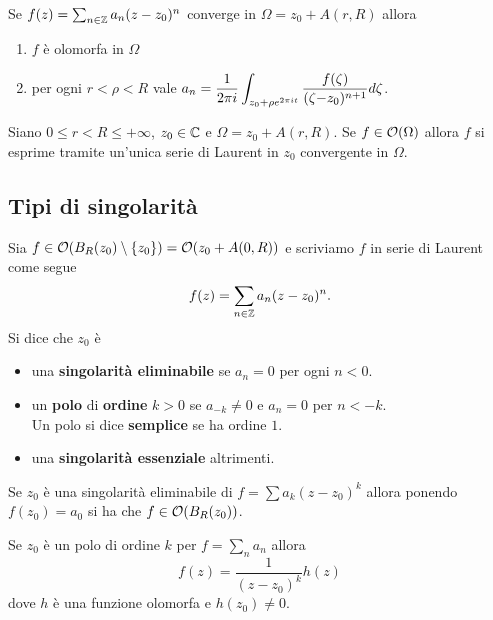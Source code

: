 \begin{multicols*}{2}
\begin{proposition}\label{ProprietaLaurent}
Se $f(z)=\sum_{n\in\mathbb{Z}}a_n(z-z_0)^n$ converge in $\Omega=z_0+A(r,R)$ allora
\begin{enumerate}[noitemsep]
\item $f$ \`e olomorfa in $\Omega$
\item per ogni $r<\rho<R$ vale $\displaystyle a_n=\cauchyint[n+1]{z_0+\rho e^{2\pi it}}$.
\end{enumerate}
\end{proposition}

\begin{theorem}\label{OlomorfaSuAnelloESerieDiLaurent}
Siano $0\leq r<R\leq +\infty$, $z_0\in \mathbb{C}$ e $\Omega=z_0+A(r,R)$. Se $f\in\mathcal{O}(\Omega)$ allora $f$ si esprime tramite un'unica serie di Laurent in $z_0$ convergente in $\Omega$.
\end{theorem}


\subsection{Tipi di singolarit\`a}
\begin{definition}
Sia $f\in \mathcal{O}(B_R(z_0)\setminus\{z_0\})=\mathcal{O}(z_0+A(0,R))$ e scriviamo $f$ in serie di Laurent come segue
\[f(z)=\sum_{n\in\mathbb{Z}}a_n(z-z_0)^n.\]
Si dice che $z_0$ \`e
\begin{itemize}[noitemsep]
\item una \textbf{singolarit\`a eliminabile} se $a_n=0$ per ogni $n<0$.
\item un \textbf{polo} di \textbf{ordine} $k>0$ se $a_{-k}\neq 0$ e $a_n=0$ per $n<-k$.\\
Un polo si dice \textbf{semplice} se ha ordine $1$.
\item una \textbf{singolarit\`a essenziale} altrimenti.
\end{itemize}
\end{definition}
\begin{remark}
Se $z_0$ \`e una singolarit\`a eliminabile di $f=\sum a_k(z-z_0)^k$ allora ponendo $f(z_0)=a_0$ si ha che $f\in\mathcal{O}(B_R(z_0))$.
\end{remark}
\begin{remark}
Se $z_0$ \`e un polo di ordine $k$ per $f=\sum_n a_n$ allora
\[f(z)=\frac1{(z-z_0)^k}h(z)\]
dove $h$ \`e una funzione olomorfa e $h(z_0)\neq 0$.
\end{remark}


\end{multicols*}
